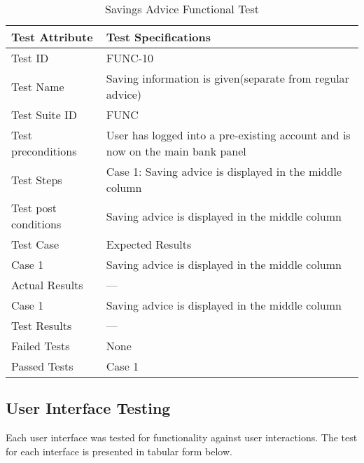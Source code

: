 \documentclass{article}
\begin{document}
\begin{table}[htbp]
\begin{center}
\begin{tabular}{|l | l|}
\hline
Test Attribute & Test Specifications \\
\hline
Test ID & FUNC-10 \\
\hline
Test Name  & Saving information is given(separate from regular advice) \\
\hline
Test Suite  ID & FUNC \\
\hline
Test preconditions & User has logged into a pre-existing account and is now on the main bank panel \\
\hline
Test Steps & Case 1: Saving advice is displayed in the middle column\\
\hline
Test post conditions &  Saving advice is displayed in the middle column \\
\hline
Test Case & Expected Results\\
\hline
Case 1  &  Saving advice is displayed in the middle column\\
\hline
Actual Results & ---\\
\hline
Case 1  &  Saving advice is displayed in the middle column\\
\hline
Test Results & ---\\
\hline
Failed Tests & None\\
\hline
Passed Tests & Case 1\\
\hline
\end{tabular}
\end{center}
\caption{Savings Advice Functional Test}
\end{table}
\label{table:2l}

\break



\subsection{User Interface Testing}

Each user interface was tested for functionality against user interactions. The test for each interface is presented in tabular form below.
\end{document}
